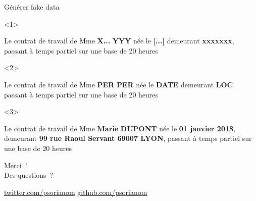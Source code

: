 \documentclass[10pt]{beamer}
\begin{document}
\begin{frame}{Générer fake data}
\begin{onlyenv}<1>
	\begin{citation}{}
		Le contrat de travail de Mme \textbf{X...} \textbf{YYY} née le \textbf{[...]} demeurant \textbf{xxxxxxx}, passant à temps partiel
	sur une base de 20 heures 
	\end{citation}
\end{onlyenv}
\begin{onlyenv}<2>
	\begin{citation}{}
		Le contrat de travail de Mme \textbf{PER} \textbf{PER} née le \textbf{DATE} demeurant \textbf{LOC}, passant à temps partiel
		sur une base de 20 heures 
	\end{citation}
\end{onlyenv}

\begin{onlyenv}<3>
	\begin{citation}{}
		Le contrat de travail de Mme \textbf{Marie} \textbf{DUPONT} née le \textbf{01 janvier 2018}, demeurant \textbf{99 rue Raoul Servant 69007 LYON}, passant à temps partiel
		sur une base de 20 heures 
	\end{citation}
\end{onlyenv}

\end{frame}
\begin{frame}[standout]

 Merci~! \\ 
 Des questions~?\\
 
 \vspace{1cm}
 
 \url{twitter.com/psorianom} 
 \url{github.com/psorianom} 
\end{frame}

\appendix
\end{document}

